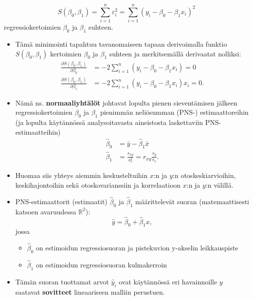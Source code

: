 \documentclass[
]{book}
\providecommand{\tightlist}{%
  \setlength{\itemsep}{0pt}\setlength{\parskip}{0pt}}
\begin{document}
\[
S(\beta_0,\beta_1) = \sum_{i=1}^{n} \varepsilon^2_i = \sum_{i=1}^{n} (y_i - \beta_0 - \beta_1 x_i)^2 
\]
regressiokertoimien \(\beta_0\) ja \(\beta_1\) suhteen.

\begin{itemize}
\item
  Tämä minimointi tapahtuu tavanomaiseen tapaan derivoimalla funktio \(S(\beta_0,\beta_1)\) kertoimien \(\beta_0\) ja \(\beta_1\) suhteen ja merkitsemällä derivaatat nolliksi:
  \begin{align*}
  \frac{\partial S(\beta_0,\beta_1)}{\partial \beta_0} &= -2 \sum_{i=1}^{n} (y_i - \beta_0 - \beta_1 x_i) = 0 \\
  \frac{\partial S(\beta_0,\beta_1)}{\partial \beta_1} &= -2 \sum_{i=1}^{n} (y_i - \beta_0 - \beta_1 x_i) x_i = 0. 
  \end{align*}
\item
  Nämä ns. \textbf{normaaliyhtälöt} johtavat lopulta pienen sieventämisen jälkeen regressiokertoimien \(\beta_0\) ja \(\beta_1\) pienimmän neliösumman (PNS-) estimaattoreihin (ja lopulta käytännössä analysoitavasta aineistosta laskettaviin PNS-estimaatteihin)
  \begin{align*}
  \widehat{\beta}_0 &= \bar{y} - \widehat{\beta}_1 \bar{x} \\
  \widehat{\beta}_1 &= \frac{s_{xy}}{s^2_x} = r_{xy} \frac{s_y}{s_x}.
  \end{align*}
\item
  Huomaa siis yhteys aiemmin keskusteltuihin \(x\):n ja \(y\):n otoskeskiarvioihin, keskihajontoihin sekä otoskovarianssiin ja korrelaatioon \(x\):n ja \(y\):n välillä.
\item
  PNS-estimaattorit (estimaatit) \(\widehat{\beta}_0\) ja \(\widehat{\beta}_1\) määrittelevät suoran (matemaattisesti katsoen avaruudessa \(\mathbb{R}^2\)):
  \[
  \widehat{y} = \widehat{\beta}_0 + \widehat{\beta}_1 x,
  \]
  jossa

  \begin{itemize}
  \tightlist
  \item
    \(\widehat{\beta}_0\) on estimoidun regressiosuoran ja pistekuvion y-akselin leikkauspiste
  \item
    \(\widehat{\beta}_1\) on estimoidun regressiosuoran kulmakerroin
  \end{itemize}
\item
  Tämän suoran tuottamat arvot \(\widehat{y}_i\) ovat käytännössä eri havainnoille \(y\) saatavat \textbf{sovitteet} lineaariseen malliin perustuen.
\end{itemize}
\end{document}

